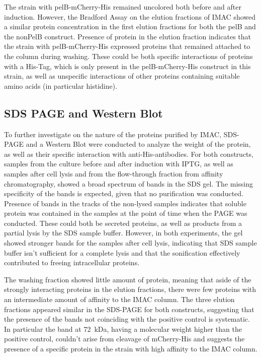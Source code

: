 \documentclass[a4paper,12pt]{article}
\begin{document}
The strain with pelB-mCherry-His remained uncolored both before and after induction. However, the Bradford Assay on the elution fractions of IMAC showed a similar protein concentration in the first elution fractions for both the pelB and  the nonPelB construct. Presence of protein in the elution fraction indicates that the strain with pelB-mCherry-His expressed proteins that remained attached to the column during washing. These could be both specific interactions of proteins with a His-Tag, which is only present in the pelB-mCherry-His construct in this strain, as well as unspecific interactions of other proteins containing suitable amino acids (in particular histidine).

\subsection{SDS PAGE and Western Blot}
To further investigate on the nature of the proteins purified by IMAC, SDS-PAGE and a Western Blot were conducted to analyze the weight of the protein, as well as their specific interaction with anti-His-antibodies. For both constructs, samples from the culture before and after induction with IPTG, as well as samples after cell lysis and from the flow-through fraction from affinity chromatography, showed a broad spectrum of bands in the SDS gel. The missing specificity of the bands is expected, given that no purification was conducted. Presence of bands in the tracks of the non-lysed samples indicates that soluble protein was contained in the samples at the point of time when the PAGE was conducted. These could both be secreted proteins, as well as products from a partial lysis by the SDS sample buffer. However, in both experiments, the gel showed stronger bands for the samples after cell lysis, indicating that SDS sample buffer isn't sufficient for a complete lysis and that the sonification effectively contributed to freeing intracellular proteins. 

The washing fraction showed little amount of protein, meaning that aside of the strongly interacting proteins in the elution fractions, there were few proteins with an intermediate amount of affinity to the IMAC column. The three elution fractions appeared similar in the SDS-PAGE for both constructs, suggesting that the presence of the bands not coinciding with the positive control is systematic. In particular the band at 72~kDa, having a molecular weight higher than the positive control, couldn't arise from cleavage of mCherry-His and suggests the presence of a specific protein in the strain with high affinity to the IMAC column.
\end{document}
